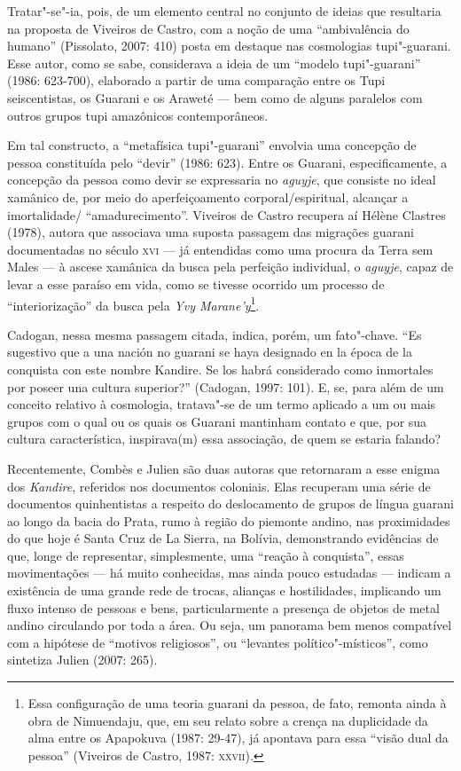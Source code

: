 Tratar"-se"-ia, pois, de um elemento central no conjunto de ideias que
resultaria na proposta de Viveiros de Castro, com a noção de uma
``ambivalência do humano'' (Pissolato, 2007: 410) posta em destaque nas
cosmologias tupi"-guarani. Esse autor, como se sabe, considerava a ideia
de um ``modelo tupi"-guarani'' (1986: 623-700), elaborado a partir de uma
comparação entre os Tupi seiscentistas, os Guarani e os Araweté --- bem
como de alguns paralelos com outros grupos tupi amazônicos
contemporâneos.

Em tal constructo, a ``metafísica tupi"-guarani'' envolvia uma concepção de
pessoa constituída pelo ``devir'' (1986: 623). Entre os Guarani,
especificamente, a concepção da pessoa como devir se expressaria no
\emph{aguyje}, que consiste no ideal xamânico de, por meio do aperfeiçoamento
corporal/espiritual, alcançar a imortalidade/ ``amadurecimento''.
Viveiros de Castro recupera aí Hélène Clastres (1978), autora que
associava uma suposta passagem das migrações guarani documentadas no
século \textsc{xvi} --- já entendidas como uma procura da Terra sem Males --- à
ascese xamânica da busca pela perfeição individual, o \emph{aguyje}, capaz de
levar a esse paraíso em vida, como se tivesse ocorrido um processo de
``interiorização'' da busca pela \emph{Yvy Marane’y}\footnote{Essa configuração
de uma teoria guarani da pessoa, de fato, remonta ainda à obra de
Nimuendaju, que, em seu relato sobre a crença na duplicidade da alma
entre os Apapokuva (1987: 29-47), já apontava para essa ``visão dual da
pessoa'' (Viveiros de Castro, 1987: \textsc{xxvii}).}.

Cadogan, nessa mesma passagem citada, indica, porém, um fato"-chave. ``Es
sugestivo que a una nación no guarani se haya designado en la época de
la conquista con este nombre Kandire. Se los habrá considerado como
inmortales por poseer una cultura superior?'' (Cadogan, 1997: 101). E,
se, para além de um conceito relativo à cosmologia, tratava"-se de um
termo aplicado a um ou mais grupos com o qual ou os quais os Guarani
mantinham contato e que, por sua cultura característica, inspirava(m)
essa associação, de quem se estaria falando?

Recentemente, Combès e Julien são duas autoras que retornaram a esse
enigma dos \emph{Kandire}, referidos nos documentos coloniais. Elas recuperam
uma série de documentos quinhentistas a respeito do deslocamento de
grupos de língua guarani ao longo da bacia do Prata, rumo à região do
piemonte andino, nas proximidades do que hoje é Santa Cruz de La
Sierra, na Bolívia, demonstrando evidências de que, longe de
representar, simplesmente, uma ``reação à conquista'', essas
movimentações --- há muito conhecidas, mas ainda pouco estudadas ---
indicam a existência de uma grande rede de trocas, alianças e
hostilidades, implicando um fluxo intenso de pessoas e bens,
particularmente a presença de objetos de metal andino circulando por
toda a área. Ou seja, um panorama bem menos compatível com a hipótese
de ``motivos religiosos'', ou ``levantes político"-místicos'', como
sintetiza Julien (2007: 265).

